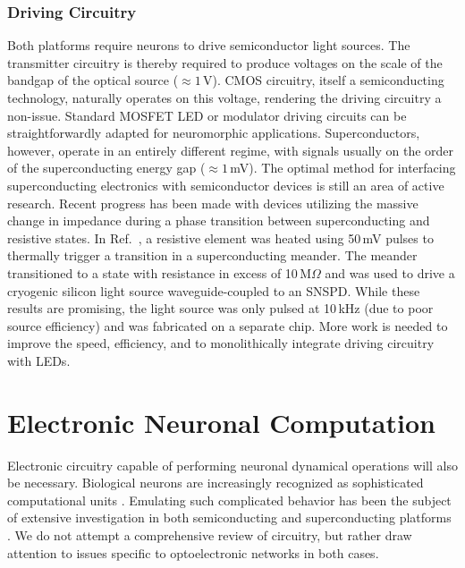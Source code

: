 \documentclass[twocolumn]{article}
\newcommand{\onlinecite}[1]{\hspace{-1 ex} \nocite{#1}\citenum{#1}}
\begin{document}
\subsubsection{Driving Circuitry}
Both platforms require neurons to drive semiconductor light sources. The transmitter circuitry is thereby required to produce voltages on the scale of the bandgap of the optical source ($\approx 1$\,V). CMOS circuitry, itself a semiconducting technology, naturally operates on this voltage, rendering the driving circuitry a non-issue. Standard MOSFET LED or modulator driving circuits \cite{bowers2016recent, halbritter2014high} can be straightforwardly adapted for neuromorphic applications. Superconductors, however, operate in an entirely different regime, with signals usually on the order of the superconducting energy gap ($\approx 1$\,mV). The optimal method for interfacing superconducting electronics with semiconductor devices is still an area of active research. Recent progress has been made with devices utilizing the massive change in impedance during a phase transition between superconducting and resistive states. In Ref.\,\onlinecite{mccaughan2019superconducting}, a resistive element was heated using 50\,mV pulses to thermally trigger a transition in a superconducting meander. The meander transitioned to a state with resistance in excess of 10\,M$\Omega$ and was used to drive a cryogenic silicon light source waveguide-coupled to an SNSPD. While these results are promising, the light source was only pulsed at 10\,kHz (due to poor source efficiency) and was fabricated on a separate chip. More work is needed to improve the speed, efficiency, and to monolithically integrate driving circuitry with LEDs.

\section{\label{sec:soma}Electronic Neuronal Computation}
Electronic circuitry capable of performing neuronal dynamical operations will also be necessary. Biological neurons are increasingly recognized as sophisticated computational units \cite{kose2000,stsp2015,haah2016,sava2017}. Emulating such complicated behavior has been the subject of extensive investigation in both semiconducting \cite{voma2007,indiveri2011neuromorphic,pfgr2013,brne2013,bega2014,abta2019} and superconducting platforms \cite{shainline2019fluxonic, crotty2010josephson, toomey2019design}. We do not attempt a comprehensive review of circuitry, but rather draw attention to issues specific to optoelectronic networks in both cases.
\end{document}
